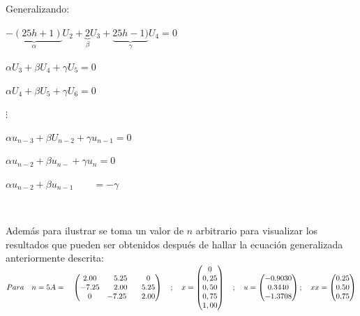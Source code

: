 \documentclass[paper=a4, parskip=full, fontsize=12pt]{scrartcl} %
\numberwithin{equation}{section} %
\numberwithin{figure}{section} %
\numberwithin{table}{section} %
\begin{document}
Generalizando:
\begin{center}
$\underbrace{-(25h+1)}_{\alpha}U_{2}+\underbrace{2}_{\beta}U_{3}+\underbrace{25h-1)}_{\gamma}U_{4}=0$
\end{center}

\begin{center}
$\alpha U_{3}+\beta U_{4}+\gamma U_{5}=0$
\end{center}

\begin{center}
$\alpha U_{4}+\beta U_{5}+\gamma U_{6}=0$
\end{center}

\begin{center}
$\vdots$
\end{center}

\begin{center}
$\alpha u_{n-3}+\beta U_{n-2}+\gamma u_{n-1}=0$
\end{center}

\begin{center}
$\alpha u_{n-2}+\beta u_{n-}+\gamma u_{n}=0$
\end{center}

\begin{center}
$\alpha u_{n-2}+\beta u_{n-1}\qquad=-\gamma$
\end{center}
\

Adem\'as para ilustrar se toma un valor de $n$ arbitrario para visualizar los resultados que pueden ser obtenidos despu\'es de hallar la ecuaci\'on generalizada anteriormente descrita:\\

$Para\quad n=5\\ A=\quad \begin{pmatrix} 2.00 & 5.25 & 0 \\ -7.25 & 2.00 & 5.25 \\ 0 & -7.25\quad  & 2.00 \end{pmatrix}\quad ;\quad x=\begin{pmatrix} 0 \\ 0,25 \\ 0,50 \\ 0,75 \\ 1,00 \end{pmatrix}\quad ;\quad u=\begin{pmatrix} -0.9030 \\ 0.3440 \\ -1.3708 \end{pmatrix};\quad xx=\begin{pmatrix} 0.25 \\ 0.50 \\ 0.75 \end{pmatrix}$
\end{document}

